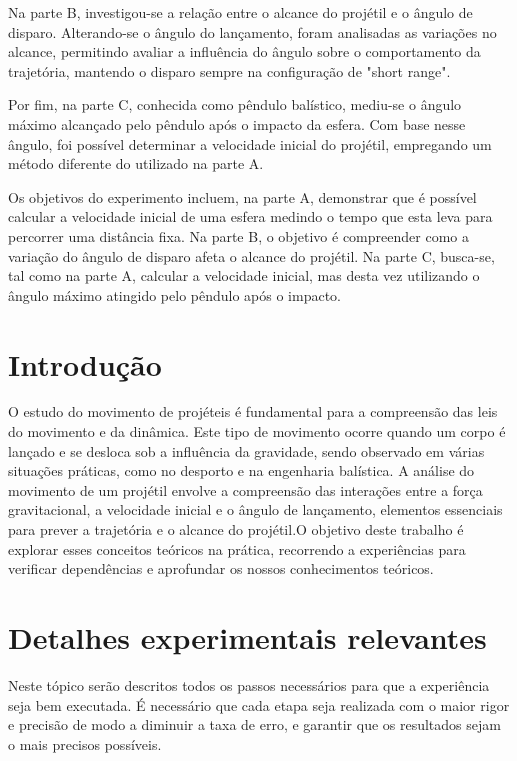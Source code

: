 \documentclass{report}
\begin{document}
Na parte B, investigou-se a relação entre o alcance do projétil e o ângulo de disparo. Alterando-se o ângulo do lançamento, foram analisadas as variações no alcance, permitindo avaliar a influência do ângulo sobre o comportamento da trajetória, mantendo o disparo sempre na configuração de "short range".

Por fim, na parte C, conhecida como pêndulo balístico, mediu-se o ângulo máximo alcançado pelo pêndulo após o impacto da esfera. Com base nesse ângulo, foi possível determinar a velocidade inicial do projétil, empregando um método diferente do utilizado na parte A.

Os objetivos do experimento incluem, na parte A, demonstrar que é possível calcular a velocidade inicial de uma esfera medindo o tempo que esta leva para percorrer uma distância fixa. Na parte B, o objetivo é compreender como a variação do ângulo de disparo afeta o alcance do projétil. Na parte C, busca-se, tal como na parte A, calcular a velocidade inicial, mas desta vez utilizando o ângulo máximo atingido pelo pêndulo após o impacto.

\chapter{Introdução}
\label{chap.introducao}

O estudo do movimento de projéteis é fundamental para a compreensão das leis do movimento e da dinâmica. Este tipo de movimento ocorre quando um corpo é lançado e se desloca sob a influência da gravidade, sendo observado em várias situações práticas, como no desporto e na engenharia balística. A análise do movimento de um projétil envolve a compreensão das interações entre a força gravitacional, a velocidade inicial e o ângulo de lançamento, elementos essenciais para prever a trajetória e o alcance do projétil.O objetivo deste trabalho é explorar esses conceitos teóricos na prática, recorrendo a experiências para verificar dependências e aprofundar os nossos conhecimentos teóricos.

\chapter{Detalhes experimentais relevantes}
\label{chap.detalhes}

Neste tópico serão descritos todos os passos necessários para que a experiência seja bem executada.
É necessário que cada etapa seja realizada com o maior rigor e precisão de modo a diminuir a taxa de erro, e garantir que os resultados sejam o mais precisos possíveis.
\end{document}
